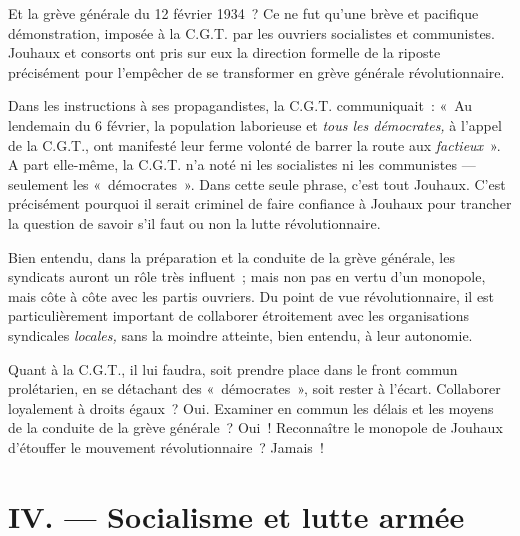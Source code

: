 \documentclass[french,twoside]{book} %
\begin{document}
Et la grève générale du 12 février 1934 ? Ce ne fut qu’une brève et pacifique démonstration, imposée à la C.G.T. par les ouvriers socialistes et communistes. Jouhaux et consorts ont pris sur eux la direction formelle de la riposte précisément pour l’empêcher de se transformer en grève générale révolutionnaire.\par
Dans les instructions à ses propagandistes, la C.G.T. communiquait : « Au lendemain du 6 février, la population laborieuse et \emph{tous les démocrates,} à l’appel de la C.G.T., ont manifesté leur ferme volonté de barrer la route aux \emph{factieux} ». A part elle-même, la C.G.T. n’a noté ni les socialistes ni les communistes — seulement les « démocrates ». Dans cette seule phrase, c’est tout Jouhaux. C’est précisément pourquoi il serait criminel de faire confiance à Jouhaux pour trancher la question de savoir s’il faut ou non la lutte révolutionnaire.\par
 Bien entendu, dans la préparation et la conduite de la grève générale, les syndicats auront un rôle très influent ; mais non pas en vertu d’un monopole, mais côte à côte avec les partis ouvriers. Du point de vue révolutionnaire, il est particulièrement important de collaborer étroitement avec les organisations syndicales \emph{locales,} sans la moindre atteinte, bien entendu, à leur autonomie.\par
Quant à la C.G.T., il lui faudra, soit prendre place dans le front commun prolétarien, en se détachant des « démocrates », soit rester à l’écart. Collaborer loyalement à droits égaux ? Oui. Examiner en commun les délais et les moyens de la conduite de la grève générale ? Oui ! Reconnaître le monopole de Jouhaux d’étouffer le mouvement révolutionnaire ? Jamais !
\section[{IV. — Socialisme et lutte armée}]{IV. — Socialisme et lutte armée}
\end{document}
